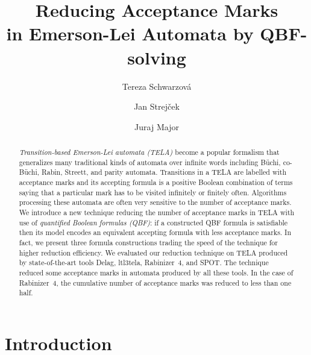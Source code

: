 \documentclass[a4paper,UKenglish,cleveref, autoref, thm-restate]{lipics-v2021}
\title{Reducing Acceptance Marks\\ in Emerson-Lei Automata by QBF-solving}
\author{Tereza Schwarzov\'{a}}{Faculty of Informatics, Masaryk University, Brno, Czech Republic}{xschwar3@mail.muni.cz}{}{}
\author{Jan Strej\v{c}ek}{Faculty of Informatics, Masaryk University, Brno, Czech Republic}{strejcek@fi.muni.cz}{https://orcid.org/0000-0001-5873-403X}{}
\author{Juraj Major}{Faculty of Informatics, Masaryk University, Brno, Czech Republic}{major@fi.muni.cz}{}{}
\begin{document}
\maketitle


\begin{abstract}
  \emph{Transition-based Emerson-Lei automata (TELA)} become a popular
  formalism that generalizes many traditional kinds of automata over
  infinite words including Büchi, co-Büchi, Rabin, Streett, and parity
  automata. Transitions in a TELA are labelled with acceptance marks
  and its accepting formula is a positive Boolean combination of terms
  saying that a particular mark has to be visited infinitely or
  finitely often. %
  Algorithms processing these automata are often very sensitive to the
  number of %
  acceptance marks. We introduce a new technique reducing the number
  of %
  acceptance marks in TELA with use of \emph{quantified Boolean
    formulas (QBF)}: if a constructed QBF formula is satisfiable then
  its model encodes an equivalent accepting formula with less
  acceptance marks. In fact, we present three formula constructions
  trading the speed of the technique for higher reduction
  efficiency. We evaluated our reduction technique on TELA produced by
  state-of-the-art tools Delag, ltl3tela, Rabinizer~4, and SPOT. The
  technique reduced some acceptance marks in automata produced by all
  these tools. In the case of Rabinizer~4, the cumulative number of
  acceptance marks was reduced to less than one half.
\end{abstract}



\section{Introduction}

\end{document}
